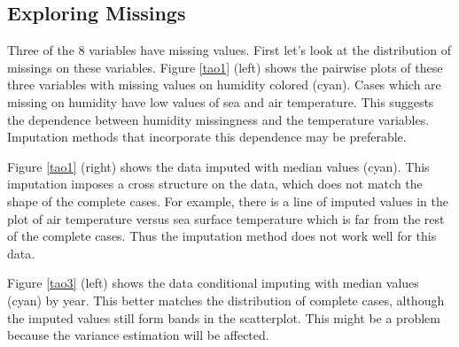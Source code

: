 \documentclass[article]{jss}
\begin{document}
\subsection{Exploring Missings}

Three of the 8 variables have missing values. First let's look at the distribution of missings on these variables. Figure \ref{tao1} (left) shows the pairwise plots of these three variables with missing values on humidity colored (cyan). Cases which are missing on humidity have low values of sea and air temperature. This suggests the dependence between humidity missingness and the temperature variables. Imputation methods that incorporate this dependence may be preferable.

Figure \ref{tao1} (right) shows the data imputed with median values (cyan). This imputation imposes a cross structure on the data, which does not match the shape of the complete cases. For example, there is a line of imputed values in the plot of air temperature versus sea surface temperature which is far from the rest of the complete cases. Thus the imputation method does not work well for this data.

Figure \ref{tao3} (left) shows the data conditional imputing with median values (cyan) by year. This better matches the distribution of complete cases, although the imputed values still form bands in the scatterplot. This might be a problem because the variance estimation will be affected. 
\end{document}
